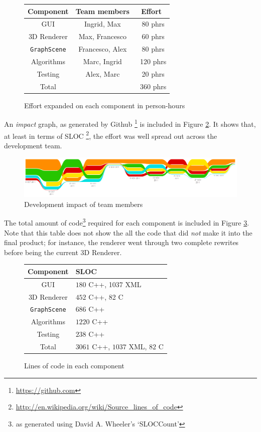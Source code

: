 \documentclass[a4paper,11pt,titlepage]{article}
\newcommand{\code}[1]{\texttt{#1}}
\begin{document}
\begin{figure}[h]
  \centering
  \begin{tabular}{c|c|c}
    Component         & Team members    & Effort \\
    \hline
    GUI               & Ingrid, Max     & ~80 phrs \\
    3D Renderer       & Max, Francesco  & ~60 phrs\\
    \code{GraphScene} & Francesco, Alex & ~80 phrs\\
    Algorithms        & Marc, Ingrid    & ~120 phrs\\
    Testing           & Alex, Marc      & ~20 phrs\\
    \hline
    Total             &                 & ~360 phrs
  \end{tabular}
  \caption{Effort expanded on each component in person-hours}
  \label{fig:effort}
\end{figure}

An \emph{impact} graph, as generated by
Github \footnote{\url{https://github.com}} is included in Figure
\ref{fig:impact}. It shows that, at least in terms of
SLOC \footnote{\url{http://en.wikipedia.org/wiki/Source_lines_of_code}},
the effort was well spread out across the development team.

\begin{figure}[h]
  \centering
  \includegraphics[width=\textwidth]{impact.png}
  \caption{Development impact of team members}
  \label{fig:impact}
\end{figure}

The total amount of code\footnote{as generated using David
  A. Wheeler's `SLOCCount'} required for each component is included in
Figure \ref{fig:sloc}. Note that this table does not show the all the
code that did \emph{not} make it into the final product; for instance,
the renderer went through two complete rewrites before being the
current 3D Renderer.

\begin{figure}[h]
  \centering
  \begin{tabular}{c|l}
    Component         & SLOC \\
    \hline
    GUI               & $180$ C++, 1037 XML\\
    3D Renderer       & $452$ C++, 82 C\\
    \code{GraphScene} & $686$ C++\\
    Algorithms        & $1220$ C++\\
    Testing           & $238$ C++ \\
    \hline
    Total             & $3061$ C++, $1037$ XML, $82$ C
  \end{tabular}
  \caption{Lines of code in each component}
  \label{fig:sloc}
\end{figure}
\end{document}
